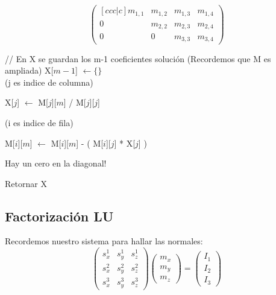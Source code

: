 \[
\begin{pmatrix}[ccc|c]
    m_{1,1}   & m_{1,2} & m_{1,3} & m_{1, 4} \\
    0         & m_{2,2} & m_{2,3} & m_{2, 4} \\
    0         & 0       & m_{3,3} & m_{3, 4}
\end{pmatrix}
\]

\begin{algorithm}[H]
\begin{algorithmic}

    // En X se guardan los m-1 coeficientes solución (Recordemos que M es ampliada)
    \State X[$m-1$] $\gets \{\}$ \\

      (j es indice de columna)


            \State X[$j$] $\gets$ M[$j$][$m$] / M[$j$][$j$]

              (i es indice de fila)

                \State M[$i$][$m$] $\gets$ M[$i$][$m$] - ( M[$i$][$j$] * X[$j$] )

            \EndFor

        \Else
            \State Hay un cero en la diagonal!
        \EndIf
    \EndFor

    \State Retornar X

\EndFunction
\end{algorithmic}
\end{algorithm}


\subsection{Factorización LU}

Recordemos nuestro sistema para hallar las normales:
\[
\begin{pmatrix}
    s_{x}^{1} & s_{y}^{1} & s_{z}^{1} \\
    s_{x}^{2} & s_{y}^{2} & s_{z}^{2} \\
    s_{x}^{3} & s_{y}^{3} & s_{z}^{3}
\end{pmatrix}
\begin{pmatrix}
    m_{x} \\
    m_{y} \\
    m_{z}
\end{pmatrix}
=
\begin{pmatrix}
    I_{1} \\
    I_{2} \\
    I_{3}
\end{pmatrix}
\]

